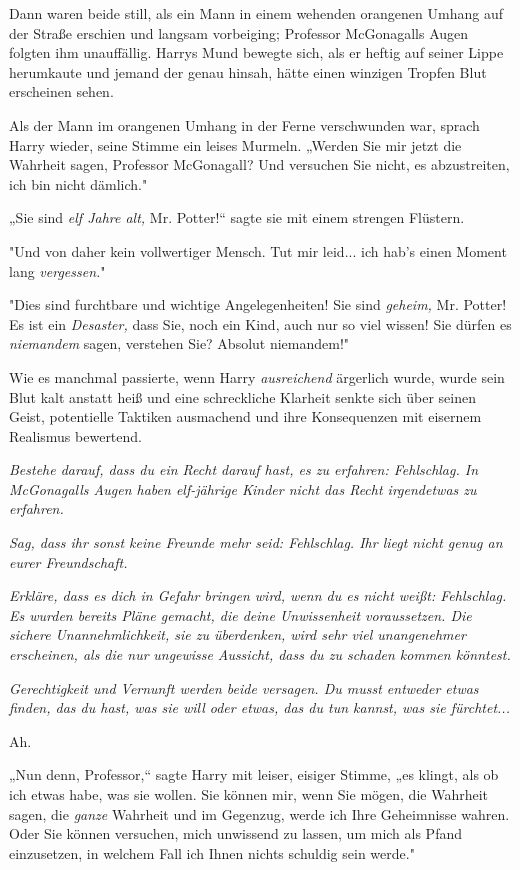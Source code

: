 {Dann waren beide still, als ein Mann in einem wehenden orangenen Umhang auf der Straße erschien und langsam vorbeiging; Professor McGonagalls Augen folgten ihm unauffällig. Harrys Mund bewegte sich, als er heftig auf seiner Lippe herumkaute und jemand der genau hinsah, hätte einen winzigen Tropfen Blut erscheinen sehen.

Als der Mann im orangenen Umhang in der Ferne verschwunden war, sprach Harry wieder, seine Stimme ein leises Murmeln. „Werden Sie mir jetzt die Wahrheit sagen, Professor McGonagall? Und versuchen Sie nicht, es abzustreiten, ich bin nicht dämlich."

„Sie sind \emph{elf Jahre alt,} Mr. Potter!“ sagte sie mit einem strengen Flüstern.

"Und von daher kein vollwertiger Mensch. Tut mir leid... ich hab's einen Moment lang \emph{vergessen.}"

"Dies sind furchtbare und wichtige Angelegenheiten! Sie sind \emph{geheim,} Mr. Potter! Es ist ein \emph{Desaster,} dass Sie, noch ein Kind, auch nur so viel wissen! Sie dürfen es \emph{niemandem} sagen, verstehen Sie? Absolut niemandem!"

Wie es manchmal passierte, wenn Harry \emph{ausreichend} ärgerlich wurde, wurde sein Blut kalt anstatt heiß und eine schreckliche Klarheit senkte sich über seinen Geist, potentielle Taktiken ausmachend und ihre Konsequenzen mit eisernem Realismus bewertend.

\emph{Bestehe darauf, dass du ein Recht darauf hast, es zu erfahren: Fehlschlag. In McGonagalls Augen haben elf-jährige Kinder nicht das Recht irgendetwas zu erfahren.}

\emph{Sag, dass ihr sonst keine Freunde mehr seid: Fehlschlag. Ihr liegt nicht genug an eurer Freundschaft.}

\emph{Erkläre, dass es dich in Gefahr bringen wird, wenn du es nicht weißt: Fehlschlag. Es wurden bereits Pläne gemacht, die deine Unwissenheit voraussetzen. Die} \emph{sichere} \emph{\emph{Unannehmlichkeit, sie zu überdenken, wird sehr viel unangenehmer erscheinen, als die nur}} \emph{ungewisse} \emph{\emph{Aussicht, dass du zu schaden kommen könntest.}}

\emph{Gerechtigkeit und Vernunft werden beide versagen. Du musst entweder etwas finden, das du hast, was sie will oder etwas, das du tun kannst, was sie fürchtet...}

Ah.

„Nun denn, Professor,“ sagte Harry mit leiser, eisiger Stimme, „es klingt, als ob ich etwas habe, was sie wollen. Sie können mir, wenn Sie mögen, die Wahrheit sagen, die \emph{ganze} Wahrheit und im Gegenzug, werde ich Ihre Geheimnisse wahren. Oder Sie können versuchen, mich unwissend zu lassen, um mich als Pfand einzusetzen, in welchem Fall ich Ihnen nichts schuldig sein werde."

}
